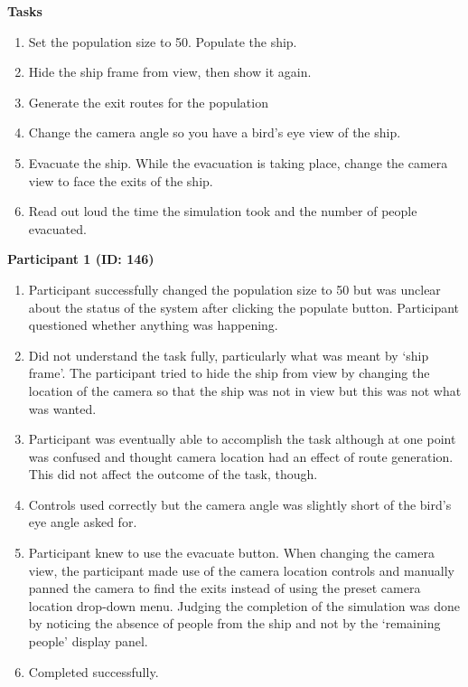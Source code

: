 
\textbf{Tasks}
\begin{enumerate}
\item Set the population size to 50. Populate the ship.
\item Hide the ship frame from view, then show it again.
\item Generate the exit routes for the population
\item Change the camera angle so you have a bird's eye view of the ship.
\item Evacuate the ship. While the evacuation is taking place, change the camera view to face the exits of the ship.
\item Read out loud the time the simulation took and the number of people evacuated.
\end{enumerate}

\textbf{Participant 1 (ID: 146)}
\begin{enumerate}
\item Participant successfully changed the population size to 50 but was unclear about the status of the system after clicking the populate button. Participant questioned whether anything was happening.
\item Did not understand the task fully, particularly what was meant by ‘ship frame’. The participant tried to hide the ship from view by changing the location of the camera so that the ship was not in view but this was not what was wanted.
\item Participant was eventually able to accomplish the task although at one point was confused and thought camera location had an effect of route generation. This did not affect the outcome of the task, though.
\item Controls used correctly but the camera angle was slightly short of the bird's eye angle asked for.
\item Participant knew to use the evacuate button. When changing the camera view, the participant made use of the camera location controls and manually panned the camera to find the exits instead of using the preset camera location drop-down menu. Judging the completion of the simulation was done by noticing the absence of people from the ship and not by the ‘remaining people’ display panel.
\item Completed successfully.
\end{enumerate}


